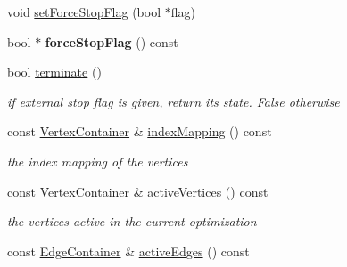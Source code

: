 \begin{DoxyCompactItemize}
\item 
void \hyperlink{classg2o_1_1SparseOptimizer_a32afd0ab949f170297b4a59f0d9eab81}{set\-Force\-Stop\-Flag} (bool $\ast$flag)
\item 
\hypertarget{classg2o_1_1SparseOptimizer_a13b3b195dd3169303c2c8e0f6edb1bb7}{bool $\ast$ {\bfseries force\-Stop\-Flag} () const }\label{classg2o_1_1SparseOptimizer_a13b3b195dd3169303c2c8e0f6edb1bb7}

\item 
\hypertarget{classg2o_1_1SparseOptimizer_ae592f525151d0cfb5bde3e7213f7ab11}{bool \hyperlink{classg2o_1_1SparseOptimizer_ae592f525151d0cfb5bde3e7213f7ab11}{terminate} ()}\label{classg2o_1_1SparseOptimizer_ae592f525151d0cfb5bde3e7213f7ab11}

\begin{DoxyCompactList}\small\item\em if external stop flag is given, return its state. False otherwise \end{DoxyCompactList}\item 
\hypertarget{classg2o_1_1SparseOptimizer_a5e98a5f879f04c013b20f9c39a9057da}{const \hyperlink{structg2o_1_1OptimizableGraph_a54f01b9b6071e65e6abeebe4afb29dec}{Vertex\-Container} \& \hyperlink{classg2o_1_1SparseOptimizer_a5e98a5f879f04c013b20f9c39a9057da}{index\-Mapping} () const }\label{classg2o_1_1SparseOptimizer_a5e98a5f879f04c013b20f9c39a9057da}

\begin{DoxyCompactList}\small\item\em the index mapping of the vertices \end{DoxyCompactList}\item 
\hypertarget{classg2o_1_1SparseOptimizer_a5715f0bab2cb9c1e8a330b2c3c217859}{const \hyperlink{structg2o_1_1OptimizableGraph_a54f01b9b6071e65e6abeebe4afb29dec}{Vertex\-Container} \& \hyperlink{classg2o_1_1SparseOptimizer_a5715f0bab2cb9c1e8a330b2c3c217859}{active\-Vertices} () const }\label{classg2o_1_1SparseOptimizer_a5715f0bab2cb9c1e8a330b2c3c217859}

\begin{DoxyCompactList}\small\item\em the vertices active in the current optimization \end{DoxyCompactList}\item 
\hypertarget{classg2o_1_1SparseOptimizer_aef20b7dd401862d572a851349d1bc124}{const \hyperlink{structg2o_1_1OptimizableGraph_a2b43e807ae6d61ef8749ca1ef7c25f62}{Edge\-Container} \& \hyperlink{classg2o_1_1SparseOptimizer_aef20b7dd401862d572a851349d1bc124}{active\-Edges} () const }\label{classg2o_1_1SparseOptimizer_aef20b7dd401862d572a851349d1bc124}


\end{DoxyCompactItemize}

